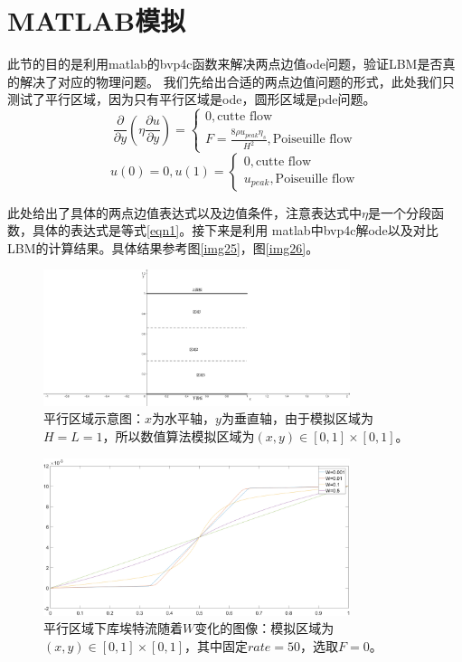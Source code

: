 \documentclass[11pt,UTF8]{ctexart}
\begin{document}
    \section{MATLAB模拟}
    \par{此节的目的是利用matlab的bvp4c函数来解决两点边值ode问题，验证LBM是否真的解决了对应的物理问题。
    我们先给出合适的两点边值问题的形式，此处我们只测试了平行区域，因为只有平行区域是ode，圆形区域是pde问题。}
    $$
    \frac{\partial}{\partial y} (\eta \frac{\partial u}{\partial y})=
    \begin{cases}
        0,\text{cutte flow}\\
        F = \frac{8\rho u_{peak} \eta_s}{H^2},\text{Poiseuille flow}
    \end{cases}
    $$
    $$
    u(0) = 0,u(1)=
    \begin{cases}
        0,\text{cutte flow}\\
        u_{peak},\text{Poiseuille flow}
    \end{cases}
    $$
    \par{此处给出了具体的两点边值表达式以及边值条件，注意表达式中$\eta$是一个分段函数，具体的表达式是等式\ref {eqn1}。接下来是利用
    matlab中bvp4c解ode以及对比LBM的计算结果。具体结果参考图\ref {img25}，图\ref {img26}。}
    \newpage
    \begin{figure}[h]
        \centerline{\includegraphics[width=0.8\textwidth]{parallel.png}}
        \caption{平行区域示意图：$x$为水平轴，$y$为垂直轴，由于模拟区域为$H=L=1$，所以数值算法模拟区域为$(x,y)\in [0,1]\times [0,1]$。}
        \label{img1}
    \end{figure}
    \begin{figure}[h]
        \centerline{\includegraphics[width=0.8\textwidth]{Parall_C_W/untitled.png}}
        \caption{平行区域下库埃特流随着$W$变化的图像：模拟区域为$(x,y)\in [0,1]\times [0,1]$，其中固定$rate=50$，选取$F=0$。}
        \label{img2}
    \end{figure}
\end{document}
